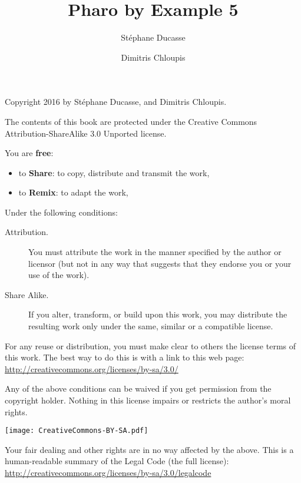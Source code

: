 \documentclass[10pt,twoside,english,showtrims]{support/latex/sbabook/sbabook}
\title{Pharo by Example 5}
\author{
    St\'ephane Ducasse \and
    Dimitris Chloupis}
\date{\gitdate\titlebreak[\smallskip]{ -- }\protect\gitCommitInfo}
\begin{document}
\maketitle
\pagestyle{titlingpage}
\thispagestyle{titlingpage} %

\cleartoverso
{\small

  Copyright 2016 by St\'ephane Ducasse, and Dimitris Chloupis.

  The contents of this book are protected under the Creative Commons
  Attribution-ShareAlike 3.0 Unported license.

  You are \textbf{free}:
  \begin{itemize}
  \item to \textbf{Share}: to copy, distribute and transmit the work,
  \item to \textbf{Remix}: to adapt the work,
  \end{itemize}

  Under the following conditions:
  \begin{description}
  \item[Attribution.] You must attribute the work in the manner specified by the
    author or licensor (but not in any way that suggests that they endorse you
    or your use of the work).
  \item[Share Alike.] If you alter, transform, or build upon this work, you may
    distribute the resulting work only under the same, similar or a compatible
    license.
  \end{description}

  For any reuse or distribution, you must make clear to others the
  license terms of this work. The best way to do this is with a link to
  this web page: \\
  \url{http://creativecommons.org/licenses/by-sa/3.0/}

  Any of the above conditions can be waived if you get permission from
  the copyright holder. Nothing in this license impairs or restricts the
  author's moral rights.

  \begin{center}
    \texttt{[image: CreativeCommons-BY-SA.pdf]}
  \end{center}

  Your fair dealing and other rights are in no way affected by the
  above. This is a human-readable summary of the Legal Code (the full
  license): \\
  \url{http://creativecommons.org/licenses/by-sa/3.0/legalcode}

}
\end{document}
